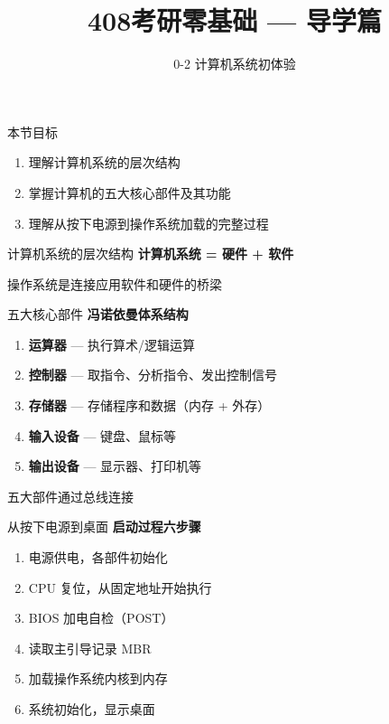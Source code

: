 \documentclass[10pt, aspectratio=169]{beamer}
\title{408考研零基础 --- 导学篇}
\subtitle{0-2 计算机系统初体验}
\author{}
\date{}
\begin{document}
\begin{frame}{本节目标}
    \begin{enumerate}
        \item 理解计算机系统的层次结构
        \item 掌握计算机的五大核心部件及其功能
        \item 理解从按下电源到操作系统加载的完整过程
    \end{enumerate}
\end{frame}

\begin{frame}{计算机系统的层次结构}
    \textbf{计算机系统 = 硬件 + 软件}
    \vspace{0.5em}
    \begin{center}
    \end{center}
    \vspace{0.3em}
    操作系统是连接应用软件和硬件的桥梁
\end{frame}

\begin{frame}{五大核心部件}
    \textbf{冯诺依曼体系结构}
    \vspace{0.3em}
    \begin{enumerate}
        \item \textbf{运算器} --- 执行算术/逻辑运算
        \item \textbf{控制器} --- 取指令、分析指令、发出控制信号
        \item \textbf{存储器} --- 存储程序和数据（内存 + 外存）
        \item \textbf{输入设备} --- 键盘、鼠标等
        \item \textbf{输出设备} --- 显示器、打印机等
    \end{enumerate}
    \vspace{0.3em}
    五大部件通过总线连接
\end{frame}

\begin{frame}{从按下电源到桌面}
    \textbf{启动过程六步骤}
    \vspace{0.3em}
    \begin{enumerate}
        \item 电源供电，各部件初始化
        \item CPU 复位，从固定地址开始执行
        \item BIOS 加电自检（POST）
        \item 读取主引导记录 MBR
        \item 加载操作系统内核到内存
        \item 系统初始化，显示桌面
    \end{enumerate}
\end{frame}
\end{document}
